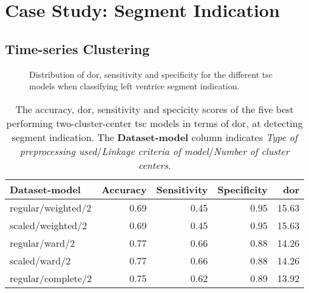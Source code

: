 \section{Case Study: Segment Indication}

\subsection{Time-series Clustering}

\begin{figure}[htb]
    \centering
    
    \caption{Distribution of \acrshort{dor}, sensitivity and specificity for the different \acrshort{tsc} models when classifying left ventrice segment indication.}
    \label{fig:tsc_segm_ind_dor_sens_spec_dist}
\end{figure}

\begin{table*}[htb]
    \centering
    \begin{tabular}{lrrrr}
        \toprule
        Dataset-model     &  Accuracy &  Sensitivity &  Specificity &  \acrshort{dor} \\
        \midrule
        regular/weighted/2 &      0.69 &         0.45 &         0.95 & 15.63 \\
        scaled/weighted/2  &      0.69 &         0.45 &         0.95 & 15.63 \\
        regular/ward/2     &      0.77 &         0.66 &         0.88 & 14.26 \\
        scaled/ward/2      &      0.77 &         0.66 &         0.88 & 14.26 \\
        regular/complete/2 &      0.75 &         0.62 &         0.89 & 13.92 \\
        \bottomrule
    \end{tabular}
    \caption{The accuracy, \acrshort{dor}, sensitivity and specicity scores of the five best performing two-cluster-center \acrshort{tsc} models in terms of \acrshort{dor}, at detecting segment indication.
             The \textbf{Dataset-model} column indicates \textit{Type of preprocessing used}$/$\textit{Linkage criteria of model}$/$\textit{Number of cluster centers}.}
    \label{tab:tsc_segm_ind_dor_sens_spec_dist}
\end{table*}

